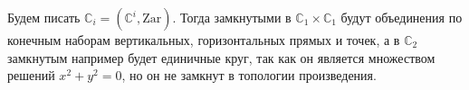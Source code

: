 \documentclass{article}
\begin{document}
\begin{enumerate}
        Будем писать $\mathbb{C}_i=(\mathbb{C}^i, \text{Zar})$. Тогда замкнутыми
        в $\mathbb{C}_1\times\mathbb{C}_1$ будут объединения по конечным наборам
        вертикальных, горизонтальных прямых и точек, а в $\mathbb{C}_2$
        замкнутым например будет единичные круг, так как он является множеством
        решений $x^2+y^2=0$, но он не замкнут в топологии произведения.
\end{enumerate}
\end{document}
